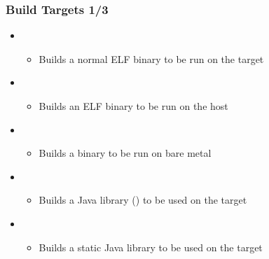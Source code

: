 \begin{frame}
  \frametitle{Build Targets 1/3}
  \begin{itemize}
  \item {}
    \begin{itemize}
    \item Builds a normal ELF binary to be run on the target
    \end{itemize}
  \item {}
    \begin{itemize}
    \item Builds an ELF binary to be run on the host
    \end{itemize}
  \item {}
    \begin{itemize}
    \item Builds a binary to be run on bare metal
    \end{itemize}
  \item {}
    \begin{itemize}
    \item Builds a Java library () to be used on the target
    \end{itemize}
  \item {}
    \begin{itemize}
    \item Builds a static Java library to be used on the target
    \end{itemize}
  \end{itemize}
\end{frame}

